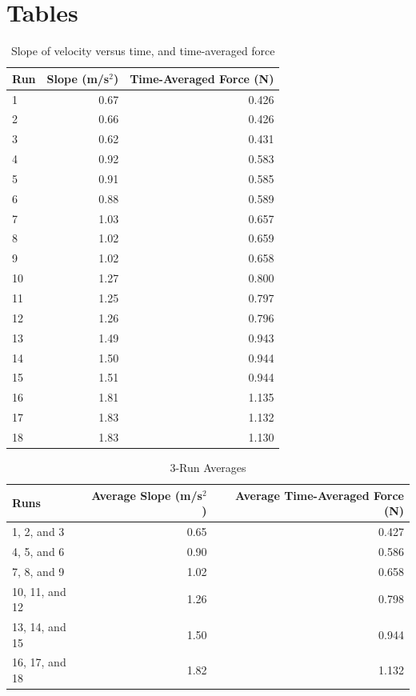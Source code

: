 \section{Tables}
\begin{table}[ht]
    \centering
    \begin{tabular}{|l|r|r|}
        \hline
        Run & Slope (m/s$^{2}$) & Time-Averaged Force (N) \\
        \hline
        1 & 0.67 & 0.426 \\
        2 & 0.66 & 0.426 \\
        3 & 0.62 & 0.431 \\
        \hline
        4 & 0.92 & 0.583 \\
        5 & 0.91 & 0.585 \\
        6 & 0.88 & 0.589 \\
        \hline
        7 & 1.03 & 0.657 \\
        8 & 1.02 & 0.659 \\
        9 & 1.02 & 0.658 \\
        \hline
        10 & 1.27 & 0.800 \\
        11 & 1.25 & 0.797 \\
        12 & 1.26 & 0.796 \\
        \hline
        13 & 1.49 & 0.943 \\
        14 & 1.50 & 0.944 \\
        15 & 1.51 & 0.944 \\
        \hline
        16 & 1.81 & 1.135 \\
        17 & 1.83 & 1.132 \\
        18 & 1.83 & 1.130 \\
        \hline
    \end{tabular}
    \caption{Slope of velocity versus time, and time-averaged force}
    \label{table:04.results}
\end{table}
\begin{table}[ht]
    \centering
    \begin{tabular}{|l|r|r|}
        \hline
        Runs & Average Slope (m/s$^{2}$) & Average Time-Averaged Force (N) \\
        \hline
        1, 2, and 3 & 0.65 & 0.427 \\
        4, 5, and 6 & 0.90 & 0.586 \\
        7, 8, and 9 & 1.02 & 0.658 \\
        10, 11, and 12 & 1.26 & 0.798 \\
        13, 14, and 15 & 1.50 & 0.944 \\
        16, 17, and 18 & 1.82 & 1.132 \\
        \hline
    \end{tabular}
    \caption{3-Run Averages}
    \label{table:04.averages}
\end{table}
